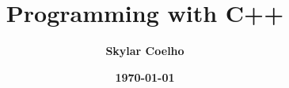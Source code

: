 \usepackage{imakeidx}
\makeindex[columns = 3, intoc]

\usepackage[]{graphicx, svg, float}

\title{\vspace{-.8in}\\ \sffamily\bfseries{}Programming with C++}
\author{\sffamily\bfseries{}Skylar Coelho}
\date{\sffamily\bfseries\today}

\usepackage{sectsty}
\allsectionsfont{\sffamily\bfseries}

\usepackage[]{minted}


\usepackage[]{hyperref}
\usepackage[dvipsnames]{xcolor}
\hypersetup{colorlinks=true, linkcolor=BlueViolet}

\newcommand{\code}[1]{\textbf{\texttt{\color{orange}#1}}}

\usepackage{booktabs}
\usepackage{multirow}
\usepackage[table,xcdraw]{xcolor}

\usepackage[]{amsmath, mathtools}

\usepackage[margin=.751in]{geometry}
